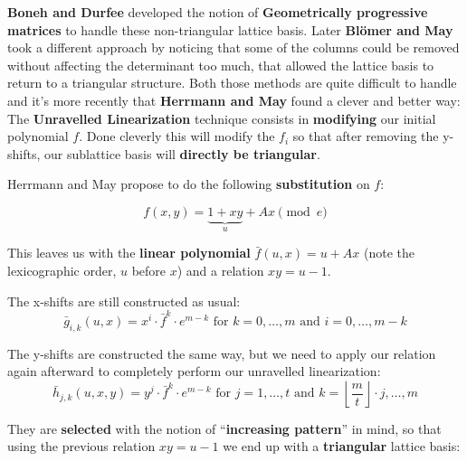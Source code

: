 \documentclass[a4paper,11pt]{article}
\begin{document}
\textbf{Boneh and Durfee} developed the notion of \textbf{Geometrically progressive matrices} to handle these non-triangular lattice basis. Later \textbf{Blömer and May} took a different approach by noticing that some of the columns could be removed without affecting the determinant too much, that allowed the lattice basis to return to a triangular structure. Both those methods are quite difficult to handle and it's more recently that \textbf{Herrmann and May} found a clever and better way:\\

The \textbf{Unravelled Linearization} technique consists in \textbf{modifying} our initial polynomial $f$. Done cleverly this will modify the $f_i$ so that after removing the y-shifts, our sublattice basis will \textbf{directly be triangular}.

Herrmann and May propose to do the following \textbf{substitution} on $f$:

\[ f(x,y)=\underbrace{1 + xy}_u + Ax \pmod{e} \]

This leaves us with the \textbf{linear polynomial} $\bar{f}(u, x) = u + Ax$ (note the lexicographic order, $u$ before $x$) and a relation $xy = u - 1$.

The x-shifts are still constructed as usual:
\[ \bar{g}_{i,k}(u,x) = x^i \cdot \bar{f}^k \cdot e^{m-k} \text{ for } k = 0,\hdots,m \text{ and } i=0,\hdots,m-k \]

The y-shifts are constructed the same way, but we need to apply our relation again afterward to completely perform our unravelled linearization:
\[ \bar{h}_{j,k}(u,x,y) = y^j \cdot \bar{f}^k \cdot e^{m-k} \text{ for } j = 1,\hdots,t \text{ and } k=\left\lfloor\frac{m}{t}\right\rfloor\cdot j,\hdots,m \]

They are \textbf{selected} with the notion of ``\textbf{increasing pattern}'' in mind, so that using the previous relation $xy = u - 1$ we end up with a \textbf{triangular} lattice basis: 

\\
\end{document}
